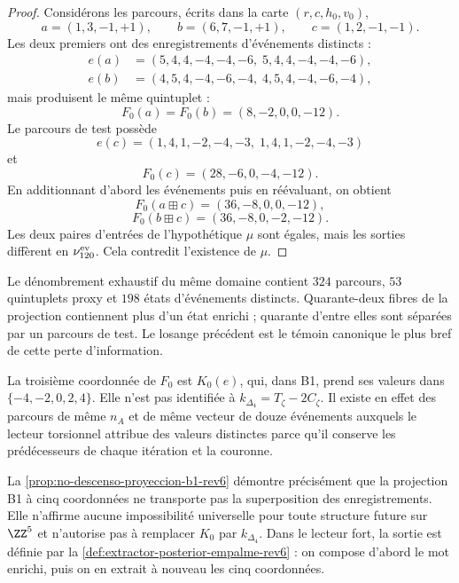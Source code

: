\begin{proof}
Considérons les parcours, écrits dans la carte \((r,c,h_0,v_0)\),
\[
 a=(1,3,-1,+1),
 \qquad
 b=(6,7,-1,+1),
 \qquad
 c=(1,2,-1,-1).
\]
Les deux premiers ont des enregistrements d’événements distincts :
\[
\begin{aligned}
 e(a)&=(5,4,4,-4,-4,-6,\;5,4,4,-4,-4,-6),\\
 e(b)&=(4,5,4,-4,-6,-4,\;4,5,4,-4,-6,-4),
\end{aligned}
\]
mais produisent le même quintuplet :
\[
 F_0(a)=F_0(b)=(8,-2,0,0,-12).
\]
Le parcours de test possède
\[
 e(c)=(1,4,1,-2,-4,-3,\;1,4,1,-2,-4,-3)
\]
et
\[
 F_0(c)=(28,-6,0,-4,-12).
\]
En additionnant d’abord les événements puis en réévaluant, on obtient
\[
 F_0(a\boxplus c)=(36,-8,0,0,-12),
\]
\[
 F_0(b\boxplus c)=(36,-8,0,-2,-12).
\]
Les deux paires d’entrées de l’hypothétique \(\mu\) sont égales, mais les sorties diffèrent en \(\nu_{120}^{\rm ev}\). Cela contredit l’existence de \(\mu\).
\end{proof}

Le dénombrement exhaustif du même domaine contient \(324\) parcours, \(53\) quintuplets proxy et \(198\) états d’événements distincts. Quarante-deux fibres de la projection contiennent plus d’un état enrichi ; quarante d’entre elles sont séparées par un parcours de test. Le losange précédent est le témoin canonique le plus bref de cette perte d’information.

\begin{remark}
\label{rem:proxy-no-torsion-fuerte-rev6} La troisième coordonnée de \(F_0\) est \(K_0(e)\), qui, dans B1, prend ses valeurs dans \(\{-4,-2,0,2,4\}\). Elle n’est pas identifiée à \(k_{\Delta_4}=T_\zeta-2C_\zeta\). Il existe en effet des parcours de même \(n_A\) et de même vecteur de douze événements auxquels le lecteur torsionnel attribue des valeurs distinctes parce qu’il conserve les prédécesseurs de chaque itération et la couronne.

La \cref{prop:no-descenso-proyeccion-b1-rev6} démontre précisément que la projection B1 à cinq coordonnées ne transporte pas la superposition des enregistrements. Elle n’affirme aucune impossibilité universelle pour toute structure future sur \(\ZZ^5\) et n’autorise pas à remplacer \(K_0\) par \(k_{\Delta_4}\). Dans le lecteur fort, la sortie est définie par la \cref{def:extractor-posterior-empalme-rev6} : on compose d’abord le mot enrichi, puis on en extrait à nouveau les cinq coordonnées.
\end{remark}

